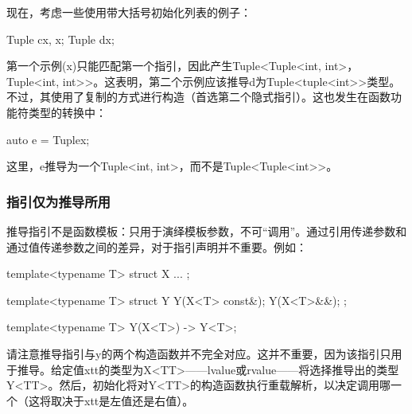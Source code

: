 现在，考虑一些使用带大括号初始化列表的例子：

\begin{cpp}
Tuple c{x, x};
Tuple d{x};
\end{cpp}

第一个示例(x)只能匹配第一个指引，因此产生Tuple<Tuple<int, int>，Tuple<int, int>{}>。这表明，第二个示例应该推导d为Tuple<tuple<int>{}>类型。不过，其使用了复制的方式进行构造（首选第二个隐式指引）。这也发生在函数功能符类型的转换中：

\begin{cpp}
auto e = Tuple{x};
\end{cpp}

这里，e推导为一个Tuple<int, int>，而不是Tuple<Tuple<int>{}>。

\subsubsection{指引仅为推导所用}

推导指引不是函数模板：只用于演绎模板参数，不可“调用”。通过引用传递参数和通过值传递参数之间的差异，对于指引声明并不重要。例如：

\begin{cpp}
template<typename T> struct X {
	...
};

template<typename T> struct Y {
	Y(X<T> const&);
	Y(X<T>&&);
};

template<typename T> Y(X<T>) -> Y<T>;
\end{cpp}

请注意推导指引与y的两个构造函数并不完全对应。这并不重要，因为该指引只用于推导。给定值xtt的类型为X<TT>——lvalue或rvalue——将选择推导出的类型Y<TT>。然后，初始化将对Y<TT>的构造函数执行重载解析，以决定调用哪一个（这将取决于xtt是左值还是右值）。





